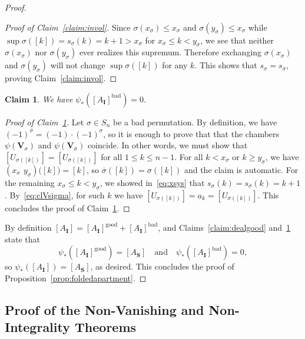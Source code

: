 \documentclass[11 pt]{article}
\theoremstyle{plain}
\newtheorem{claims}{Claim}
\theoremstyle{definition}
\numberwithin{equation}{section}
\newcommand\II{\mathbf{I}}
\newcommand\VV{\mathbf{V}}
\newcommand\bS{\mathbf{S}}
\begin{document}
\begin{proof}
\begin{proof}[Proof of Claim~\ref{claim:invol}]
Since $\sigma(x_\sigma)\leq x_\sigma$ and $\sigma(y_\sigma)\leq x_\sigma$ while $\sup\sigma([k])=s_\sigma(k)=k+1>x_\sigma$ for $x_\sigma\leq k<y_\sigma$, we see that neither $\sigma(x_\sigma)$ nor 
$\sigma(y_\sigma)$ ever realizes this supremum. Therefore exchanging $\sigma(x_\sigma)$ and $\sigma(y_\sigma)$ will not change $\sup \sigma([k])$ for any $k$. This shows that $s_\sigma=s_{\overline{\sigma}}$, proving Claim~\ref{claim:invol}.
\end{proof}

\begin{claims}
\label{claim:dealbad}
We have $\psi_{\ast}([A_{\II}]^{\text{bad}}) = 0$.
\end{claims}
\begin{proof}[Proof of Claim~\ref{claim:dealbad}]
Let $\sigma \in S_n$ be a bad permutation.  By definition, we have
$(-1)^{\overline{\sigma}} = (-1) \cdot (-1)^{\sigma}$, so it is enough to prove
that that the chambers $\psi(\VV_{\sigma})$ and $\psi(\VV_{\overline{\sigma}})$ coincide. 
In other words, we must show that
$[U_{\sigma([k])}]=[U_{\overline{\sigma}([k])}]$ for all $1\leq k\leq n-1$.
For all $k<x_\sigma$ or $k\geq y_\sigma$, we have $(x_\sigma\ \,y_\sigma)\big([k])=[k]$, so 
$\overline{\sigma}([k])=\sigma([k])$ and the claim is automatic.  For the remaining 
$x_\sigma\leq k<y_\sigma$, we showed in~\eqref{eq:xsys} that $s_\sigma(k)=s_{\overline{\sigma}}(k)=k+1$. 
By~\eqref{eq:clVsigma}, for such $k$ we have 
$[U_{\sigma([k])}]=a_k=[U_{\overline{\sigma}([k])}]$. This concludes the proof of Claim~\ref{claim:dealbad}.
\end{proof}

By definition $[A_{\II}] = [A_{\II}]^{\text{good}} + [A_{\II}]^{\text{bad}}$, and Claims~\ref{claim:dealgood} and~\ref{claim:dealbad} state that 
\[\psi_{\ast}([A_{\II}]^{\text{good}}) = [A_{\bS}] \quad \text{and} \quad \psi_{\ast}([A_{\II}]^{\text{bad}}) = 0,\]
so $\psi_{\ast}([A_{\II}]) = [A_{\bS}]$, as desired. This concludes the proof of Proposition~\ref{prop:foldedapartment}.
\end{proof}

\subsection{Proof of the Non-Vanishing and Non-Integrality Theorems}
\label{section:nonvanishingnonintegrality}
\end{document}

